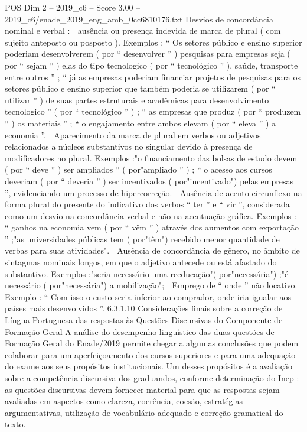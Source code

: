 \begin{textsample}{POS Dim 2 – 2019\_c6 – Score 3.00 – 2019\_c6/enade\_2019\_eng\_amb\_0cc6810176.txt}
Desvios de concordância nominal e verbal :  ausência ou presença indevida de marca de plural ( com sujeito anteposto ou posposto ).
Exemplos : “ Os setores público e ensino superior poderiam desenvolverem ( por “ desenvolver ” ) pesquisas para empresas seja ( por “ sejam ” ) elas do tipo tecnologico ( por “ tecnológico ” ), saúde, transporte entre outros ” ; “ já as empresas poderiam financiar projetos de pesquisas para os setores público e ensino superior que também poderia se utilizarem ( por “ utilizar ” ) de suas partes estruturais e acadêmicas para desenvolvimento tecnologico ” ( por “ tecnológico ” ) ; “ as empresas que produz ( por “ produzem ” ) os materiais ” ; “ o engajamento entre ambos elevam ( por “ eleva ” ) a economia ”.  Aparecimento da marca de plural em verbos ou adjetivos relacionados a núcleos substantivos no singular devido à presença de modificadores no plural.
Exemplos :"o financiamento das bolsas de estudo devem ( por “ deve ” ) ser ampliados ” ( por"ampliado ” ) ; “ o acesso aos cursos deveriam ( por “ deveria ” ) ser incentivados ( por"incentivado") pelas empresas ”, evidenciando um processo de hipercorreção.  Ausência de acento circunflexo na forma plural do presente do indicativo dos verbos “ ter ” e “ vir ”, considerada como um desvio na concordância verbal e não na acentuação gráfica.
Exemplos : “ ganhos na economia vem ( por “ vêm ” ) através dos aumentos com exportação ” ;"as universidades públicas tem ( por"têm") recebido menor quantidade de verbas para suas atividades".  Ausência de concordância de gênero, no âmbito de sintagmas nominais longos, em que o adjetivo antecede ou está afastado do substantivo.
Exemplos :"seria necessário uma reeducação"( por"necessária") ;"é necessário ( por"necessária") a mobilização";  Emprego de “ onde ” não locativo.
Exemplo : “ Com isso o custo seria inferior ao comprador, onde iria igualar aos países mais desenvolvidos ”. 6.3.1.10 Considerações finais sobre a correção de Língua Portuguesa das respostas às Questões Discursivas do Componente de Formação Geral A análise do desempenho linguístico das duas questões de Formação Geral do Enade/2019 permite chegar a algumas conclusões que podem colaborar para um aperfeiçoamento dos cursos superiores e para uma adequação do exame aos seus propósitos institucionais.
Um desses propósitos é a avaliação sobre a competência discursiva dos graduandos, conforme determinação do Inep : as questões discursivas devem fornecer material para que as respostas sejam avaliadas em aspectos como clareza, coerência, coesão, estratégias argumentativas, utilização de vocabulário adequado e correção gramatical do texto.

\end{textsample}
